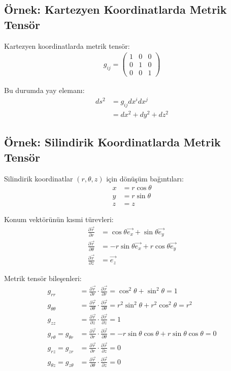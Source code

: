 \documentclass[11pt,letterpaper,twocolumn]{fenbil}
\begin{document}
\subsection{Örnek: Kartezyen Koordinatlarda Metrik Tensör}

Kartezyen koordinatlarda metrik tensör:
\begin{align}
g_{ij} = \begin{pmatrix}
1 & 0 & 0 \\
0 & 1 & 0 \\
0 & 0 & 1
\end{pmatrix}
\end{align}

Bu durumda yay elemanı:
\begin{align}
ds^2 &= g_{ij}dx^i dx^j \\
&= dx^2 + dy^2 + dz^2
\end{align}

\subsection{Örnek: Silindirik Koordinatlarda Metrik Tensör}

Silindirik koordinatlar $(r, \theta, z)$ için dönüşüm bağıntıları:
\begin{align}
x &= r\cos\theta \\
y &= r\sin\theta \\
z &= z
\end{align}

Konum vektörünün kısmi türevleri:
\begin{align}
\frac{\partial \vec{r}}{\partial r} &= \cos\theta\vec{e_x} + \sin\theta\vec{e_y} \\
\frac{\partial \vec{r}}{\partial \theta} &= -r\sin\theta\vec{e_x} + r\cos\theta\vec{e_y} \\
\frac{\partial \vec{r}}{\partial z} &= \vec{e_z}
\end{align}

Metrik tensör bileşenleri:
\begin{align}
g_{rr} &= \frac{\partial \vec{r}}{\partial r} \cdot \frac{\partial \vec{r}}{\partial r} = \cos^2\theta + \sin^2\theta = 1 \\
g_{\theta\theta} &= \frac{\partial \vec{r}}{\partial \theta} \cdot \frac{\partial \vec{r}}{\partial \theta} = r^2\sin^2\theta + r^2\cos^2\theta = r^2 \\
g_{zz} &= \frac{\partial \vec{r}}{\partial z} \cdot \frac{\partial \vec{r}}{\partial z} = 1 \\
g_{r\theta} = g_{\theta r} &= \frac{\partial \vec{r}}{\partial r} \cdot \frac{\partial \vec{r}}{\partial \theta} = -r\sin\theta\cos\theta + r\sin\theta\cos\theta = 0 \\
g_{rz} = g_{zr} &= \frac{\partial \vec{r}}{\partial r} \cdot \frac{\partial \vec{r}}{\partial z} = 0 \\
g_{\theta z} = g_{z\theta} &= \frac{\partial \vec{r}}{\partial \theta} \cdot \frac{\partial \vec{r}}{\partial z} = 0
\end{align}
\end{document}
